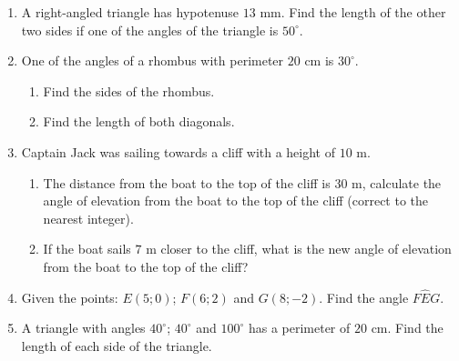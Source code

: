 \begin{eocexercises}{}
\begin{enumerate}[itemsep=6pt, label=\textbf{\arabic*}. ]
\item A right-angled triangle has hypotenuse $13$ mm. Find the length of the other two sides if one of the angles of the triangle is $50^{\circ}$.
\item One of the angles of a rhombus with perimeter $20$ cm is $30^{\circ}$. 
\begin{enumerate}[noitemsep, label=\textbf{(\alph*)} ]
\item Find the sides of the rhombus. 
\item Find the length of both diagonals. 
\end{enumerate} 
\item Captain Jack was sailing towards a cliff with a height of $10$ m. 
\begin{enumerate}[noitemsep, label=\textbf{(\alph*)} ] 
\item The distance from the boat to the top of the cliff is $30$ m, calculate the angle of elevation from the boat to the top of the cliff (correct to the nearest integer).
\item If the boat sails $7$ m closer to the cliff, what is the new angle of elevation from the boat to the top of the cliff? 
\end{enumerate} 
\item Given the points: $E(5;0)$; $F(6;2)$ and $G(8;-2)$. Find the angle $F\hat{E}G$. 
\item  A triangle with angles $40^{\circ}$; $40^{\circ}$ and $100^{\circ}$ has a perimeter of $20$ cm. Find the length of each side of the triangle. 

\end{enumerate}
\end{eocexercises}




















